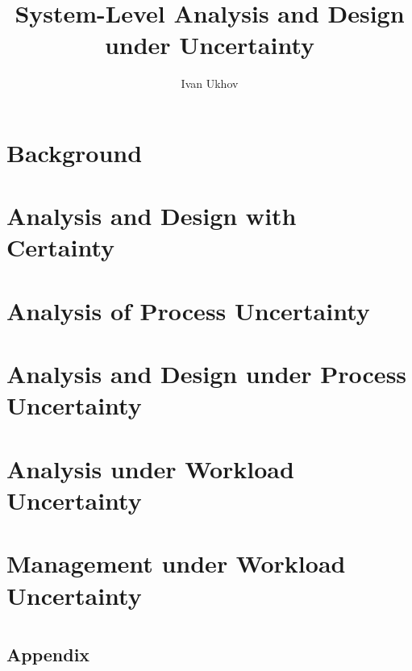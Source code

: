 \documentclass{thesis}
\title{
  System-Level Analysis and Design\\[0.2em]
  under Uncertainty
}
\author{Ivan Ukhov}
\begin{document}
\chapter{\introductiontitle}
\glsresetall
\newcommand{\inputsection}[1]{}


\chapter{Background}
\glsresetall
\renewcommand{\inputsection}[1]{}


\chapter{Analysis and Design with Certainty}
\glsresetall
\renewcommand{\inputsection}[1]{}


\chapter{Analysis of Process Uncertainty}
\glsresetall
\renewcommand{\inputsection}[1]{}


\chapter{Analysis and Design under Process Uncertainty}
\glsresetall
\renewcommand{\inputsection}[1]{}


\chapter{Analysis under Workload Uncertainty}
\glsresetall
\renewcommand{\inputsection}[1]{}


\chapter{Management under Workload Uncertainty}
\glsresetall
\renewcommand{\inputsection}[1]{}


\chapter{\conclusiontitle}
\glsresetall


\begin{appendices}
\chapter{Appendix}
\glsresetall
\renewcommand{\inputsection}[1]{}

\end{appendices}

\printbibliography
\end{document}
